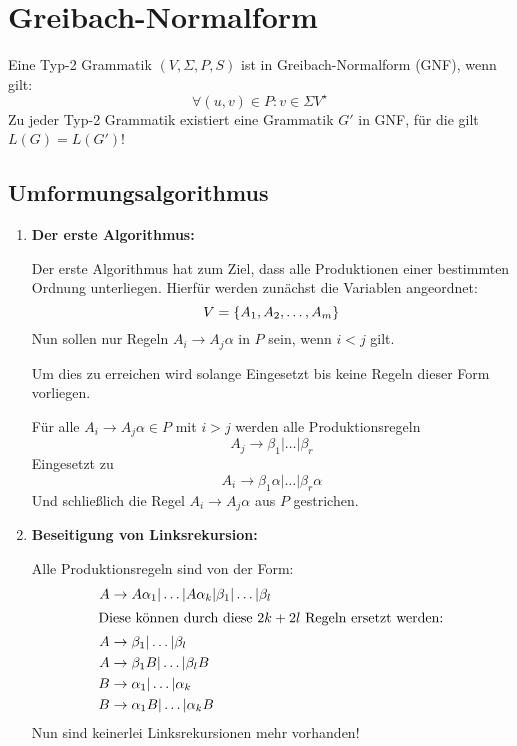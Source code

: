 \section{Greibach-Normalform}
Eine Typ-2 Grammatik $(V,\Sigma,P,S)$ ist in Greibach-Normalform (GNF),  wenn gilt:
\begin{equation*}
	\forall (u,v)\in P: v\in \Sigma V^\star
\end{equation*}
Zu jeder Typ-2 Grammatik existiert eine Grammatik $G'$ in GNF, für die gilt $L(G)=L(G')$!

\subsection{Umformungsalgorithmus}
\begin{enumerate}
	\item \textbf{Der erste Algorithmus:}

	Der erste Algorithmus hat zum Ziel, dass alle Produktionen einer bestimmten Ordnung unterliegen.
	Hierfür werden zunächst die Variablen angeordnet:
	\begin{equation*}
		V=\left\{ A_1,A_2,\ldots,A_m \right\}
	\end{equation*}
	Nun sollen nur Regeln $A_i\rightarrow A_j\alpha$ in $P$ sein, wenn $i<j$ gilt.

	Um dies zu erreichen wird solange Eingesetzt bis keine Regeln dieser Form vorliegen.

	Für alle $A_i\rightarrow A_j\alpha \in P$ mit $i> j$ werden alle Produktionsregeln
	\begin{equation*}
		A_j\rightarrow \beta_1|\ldots|\beta_r
	\end{equation*}
	Eingesetzt zu
	\begin{equation*}
		A_i\rightarrow \beta_1\alpha|\ldots|\beta_r\alpha
	\end{equation*}
	Und schließlich die Regel $A_i\rightarrow A_j\alpha$ aus $P$ gestrichen.

	\item \textbf{Beseitigung von Linksrekursion:}

	Alle Produktionsregeln sind von der Form:
	\begin{align*}
		A&\rightarrow A\alpha_1|\ldots|A\alpha_k|\beta_1|\ldots|\beta_l\\
		\intertext{Diese können durch diese $2k+2l$ Regeln ersetzt werden:}
		A&\rightarrow \beta_1|\ldots|\beta_l\\
		A&\rightarrow \beta_1B|\ldots|\beta_lB\\
		B&\rightarrow \alpha_1|\ldots|\alpha_k\\
		B&\rightarrow \alpha_1B|\ldots|\alpha_kB
	\end{align*}%
	Nun sind keinerlei Linksrekursionen mehr vorhanden!


\end{enumerate}
